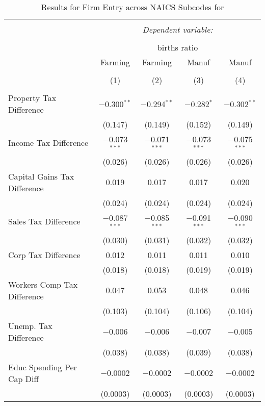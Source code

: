 
\begin{table}[!htbp] \centering 
  \caption{Results for Firm Entry across NAICS Subcodes for } 
  \label{naics} 
\small 
\begin{tabular}{@{\extracolsep{5pt}}lcccc} 
\\[-1.8ex]\hline 
\hline \\[-1.8ex] 
 & \multicolumn{4}{c}{\textit{Dependent variable:}} \\ 
\cline{2-5} 
\\[-1.8ex] & \multicolumn{4}{c}{births ratio} \\ 
 & Farming & Farming & Manuf & Manuf \\ 
\\[-1.8ex] & (1) & (2) & (3) & (4)\\ 
\hline \\[-1.8ex] 
 Property Tax Difference & $-$0.300$^{**}$ & $-$0.294$^{**}$ & $-$0.282$^{*}$ & $-$0.302$^{**}$ \\ 
  & (0.147) & (0.149) & (0.152) & (0.149) \\ 
  Income Tax Difference & $-$0.073$^{***}$ & $-$0.071$^{***}$ & $-$0.073$^{***}$ & $-$0.075$^{***}$ \\ 
  & (0.026) & (0.026) & (0.026) & (0.026) \\ 
  Capital Gains Tax Difference & 0.019 & 0.017 & 0.017 & 0.020 \\ 
  & (0.024) & (0.024) & (0.024) & (0.024) \\ 
  Sales Tax Difference & $-$0.087$^{***}$ & $-$0.085$^{***}$ & $-$0.091$^{***}$ & $-$0.090$^{***}$ \\ 
  & (0.030) & (0.031) & (0.032) & (0.032) \\ 
  Corp Tax Difference & 0.012 & 0.011 & 0.011 & 0.010 \\ 
  & (0.018) & (0.018) & (0.019) & (0.019) \\ 
  Workers Comp Tax Difference & 0.047 & 0.053 & 0.048 & 0.046 \\ 
  & (0.103) & (0.104) & (0.106) & (0.104) \\ 
  Unemp. Tax Difference & $-$0.006 & $-$0.006 & $-$0.007 & $-$0.005 \\ 
  & (0.038) & (0.038) & (0.039) & (0.038) \\ 
  Educ Spending Per Cap Diff & $-$0.0002 & $-$0.0002 & $-$0.0002 & $-$0.0002 \\ 
  & (0.0003) & (0.0003) & (0.0003) & (0.0003) \\ 

\end{tabular}
\end{table}

